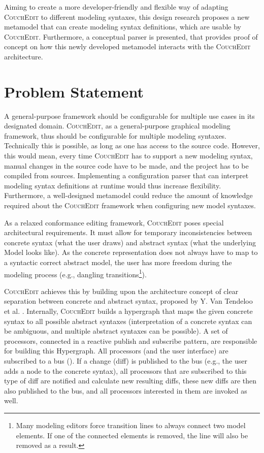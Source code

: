 Aiming to create a more developer-friendly and flexible way of adapting \textsc{CouchEdit} to different modeling syntaxes, this design research proposes a new metamodel that can create modeling syntax definitions, which are usable by \textsc{CouchEdit}. Furthermore, a conceptual parser is presented, that provides proof of concept on how this newly developed metamodel interacts with the \textsc{CouchEdit} architecture.

\section{Problem Statement}
\label{sec:problem_statement}

A general-purpose framework should be configurable for multiple use cases in its designated domain. \textsc{CouchEdit}, as a general-purpose graphical modeling framework, thus should be configurable for multiple modeling syntaxes. Technically this is possible, as long as one has access to the source code. However, this would mean, every time \textsc{CouchEdit} has to support a new modeling syntax, manual changes in the source code have to be made, and the project has to be compiled from sources. Implementing a configuration parser that can interpret modeling syntax definitions at runtime would thus increase flexibility. Furthermore, a well-designed metamodel could reduce the amount of knowledge required about the \textsc{CouchEdit} framework when configuring new model syntaxes.

As a relaxed conformance editing framework, \textsc{CouchEdit} poses special architectural requirements. It must allow for temporary inconsistencies between concrete syntax (what the user draws) and abstract syntax (what the underlying Model looks like). As the concrete representation does not always have to map to a syntactic correct abstract model, the user has more freedom during the modeling process (e.g., dangling transitions\footnote{Many modeling editors force transition lines to always connect two model elements. If one of the connected elements is removed, the line will also be removed as a result.}).

\textsc{CouchEdit} achieves this by building upon the architecture concept of clear separation between concrete and abstract syntax, proposed by Y. Van Tendeloo et al. \cite{van_tendeloo_concrete_2017}. Internally, \textsc{CouchEdit} builds a hypergraph that maps the given concrete syntax to all possible abstract syntaxes (interpretation of a concrete syntax can be ambiguous, and multiple abstract syntaxes can be possible). A set of processors, connected in a reactive publish and subscribe pattern, are responsible for building this Hypergraph. All processors (and the user interface) are subscribed to a bus (). If a change (diff) is published to the bus (e.g., the user adds a node to the concrete syntax), all processors that are subscribed to this type of diff are notified and calculate new resulting diffs, these new diffs are then also published to the bus, and all processors interested in them are invoked as well.

